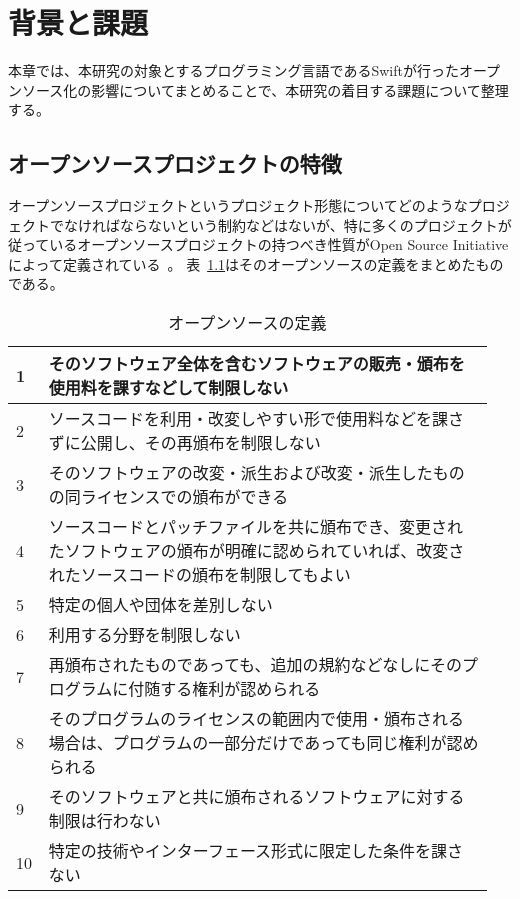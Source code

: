 \chapter{背景と課題}
\label{open-source}

本章では、本研究の対象とするプログラミング言語であるSwiftが行ったオープンソース化の影響についてまとめることで、本研究の着目する課題について整理する。

\section{オープンソースプロジェクトの特徴}
\label{open-source:feature}

オープンソースプロジェクトというプロジェクト形態についてどのようなプロジェクトでなければならないという制約などはないが、特に多くのプロジェクトが従っているオープンソースプロジェクトの持つべき性質がOpen Source Initiativeによって定義されている~\cite{opensource}。
表~\ref{table:open-source-definition}はそのオープンソースの定義をまとめたものである。

\begin{table}[!hbtp]
    \begin{center}
        \caption{オープンソースの定義}
        \begin{tabular}{|p{0.05\linewidth}|p{0.9\linewidth}|}
            \hline
            1 & そのソフトウェア全体を含むソフトウェアの販売・頒布を使用料を課すなどして制限しない \\
            \hline
            2 & ソースコードを利用・改変しやすい形で使用料などを課さずに公開し、その再頒布を制限しない \\
            \hline
            3 & そのソフトウェアの改変・派生および改変・派生したものの同ライセンスでの頒布ができる \\
            \hline
            4 & ソースコードとパッチファイルを共に頒布でき、変更されたソフトウェアの頒布が明確に認められていれば、改変されたソースコードの頒布を制限してもよい \\
            \hline
            5 & 特定の個人や団体を差別しない \\
            \hline
            6 & 利用する分野を制限しない \\
            \hline
            7 & 再頒布されたものであっても、追加の規約などなしにそのプログラムに付随する権利が認められる \\
            \hline
            8 & そのプログラムのライセンスの範囲内で使用・頒布される場合は、プログラムの一部分だけであっても同じ権利が認められる \\
            \hline
            9 & そのソフトウェアと共に頒布されるソフトウェアに対する制限は行わない \\
            \hline
            10 & 特定の技術やインターフェース形式に限定した条件を課さない \\
            \hline
        \end{tabular}
        \label{table:open-source-definition}
    \end{center}
\end{table}

